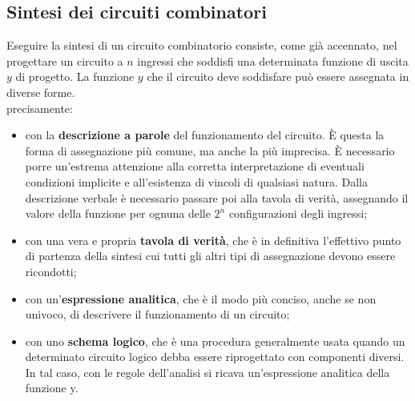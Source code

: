 \documentclass[a4paper]{extarticle}
\begin{document}
\subsection{Sintesi dei circuiti combinatori}
Eseguire la sintesi di un circuito combinatorio consiste, come già accennato, nel progettare un circuito a \(n\) ingressi che soddisfi una determinata funzione di uscita \(y\) di progetto. La funzione \(y\) che il circuito deve soddisfare può essere assegnata in diverse forme.\\
precisamente:

\begin{itemize}
    \item con la \textbf{descrizione a parole} del funzionamento del circuito. È questa la forma di assegnazione più comune, ma anche la più imprecisa. È necessario porre un’estrema attenzione alla corretta interpretazione di eventuali condizioni implicite e all’esistenza di vincoli di qualsiasi natura. Dalla descrizione verbale è necessario passare poi alla tavola di verità, assegnando il valore della funzione per ognuna delle \(2^n\) configurazioni degli ingressi;

    \item con una vera e propria \textbf{tavola di verità}, che è in definitiva l’effettivo punto di partenza della sintesi cui tutti gli altri tipi di assegnazione devono essere ricondotti;

    \item con un’\textbf{espressione analitica}, che è il modo più conciso, anche se non univoco, di descrivere il funzionamento di un circuito;

    \item con uno \textbf{schema logico}, che è una procedura generalmente usata quando un determinato circuito logico debba essere riprogettato con componenti diversi. In tal caso, con le regole dell’analisi si ricava un’espressione analitica della funzione y.
\end{itemize}
\end{document}
